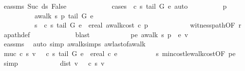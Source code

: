 \begin{isabellebody}
\ e{\isacharunderscore}assms{\isacharparenleft}{}{\isacharparenright}\ Suc{\isacharparenleft}{}{\isacharparenright}\ ds\ False\isanewline
\ \ \ \ \ \ \ \ \ \ \ \isamarkupfalse%
\ {\isacharparenleft}cases\ {\isachardoublequoteopen}{\isasymmu}\ c\ s\ {\isacharparenleft}tail\ G\ e{\isacharparenright}{\isachardoublequoteclose}{\isacharcomma}\ auto{\isacharparenright}\isanewline
\ \ \ \ \ \ \ \ \isamarkupfalse%
\ p\ \ \isanewline
\ \ \ \ \ \ \ \ \ \ {\isachardoublequoteopen}awalk\ s\ p\ {\isacharparenleft}tail\ G\ e{\isacharparenright}{\isachardoublequoteclose}\ \isanewline
\ \ \ \ \ \ \ \ \ \ {\isasymmu}s{\isacharcolon}\ {\isachardoublequoteopen}{\isasymmu}\ c\ s\ {\isacharparenleft}tail\ G\ e{\isacharparenright}\ {\isacharequal}\ ereal\ {\isacharparenleft}awalk{\isacharunderscore}cost\ c\ p{\isacharparenright}{\isachardoublequoteclose}\isanewline
\ \ \ \ \ \ \ \ \ \ \isamarkupfalse%
\ witness{\isacharunderscore}path{\isacharbrackleft}OF\ {\isasymmu}r{\isacharbrackright}\ \isamarkupfalse%
\ apath{\isacharunderscore}def\ \isanewline
\ \ \ \ \ \ \ \ \ \ \isamarkupfalse%
\ blast\isanewline
\ \ \ \ \ \ \ \ \isamarkupfalse%
\ \isamarkupfalse%
\ pe{\isacharcolon}\ {\isachardoublequoteopen}awalk\ s\ {\isacharparenleft}p\ {\isacharat}\ {\isacharbrackleft}e{\isacharbrackright}{\isacharparenright}\ v{\isachardoublequoteclose}\ \isanewline
\ \ \ \ \ \ \ \ \ \ \isamarkupfalse%
\ e{\isacharunderscore}assms{\isacharparenleft}{}{\isacharcomma}{}{\isacharparenright}\ \isamarkupfalse%
\ {\isacharparenleft}auto\ simp{\isacharcolon}\ awalk{\isacharunderscore}simps\ awlast{\isacharunderscore}of{\isacharunderscore}awalk{\isacharparenright}\isanewline
\ \ \ \ \ \ \ \ \isamarkupfalse%
\ muc{\isacharcolon}{\isachardoublequoteopen}{\isasymmu}\ c\ s\ v\ {\isasymle}\ {\isasymmu}\ c\ s\ {\isacharparenleft}tail\ G\ e{\isacharparenright}\ {\isacharplus}\ ereal\ {\isacharparenleft}c\ e{\isacharparenright}{\isachardoublequoteclose}\ \isanewline
\ \ \ \ \ \ \ \ \isamarkupfalse%
\ {\isasymmu}s\ min{\isacharunderscore}cost{\isacharunderscore}le{\isacharunderscore}walk{\isacharunderscore}cost{\isacharbrackleft}OF\ pe{\isacharbrackright}\ \isamarkupfalse%
\ simp\ \isanewline
\ \ \ \ \ \ \ \ \isamarkupfalse%
\ \ {\isachardoublequoteopen}dist\ v\ {\isasymge}\ {\isasymmu}\ c\ s\ v{\isachardoublequoteclose}\ \ \isamarkupfalse%

\end{isabellebody}

